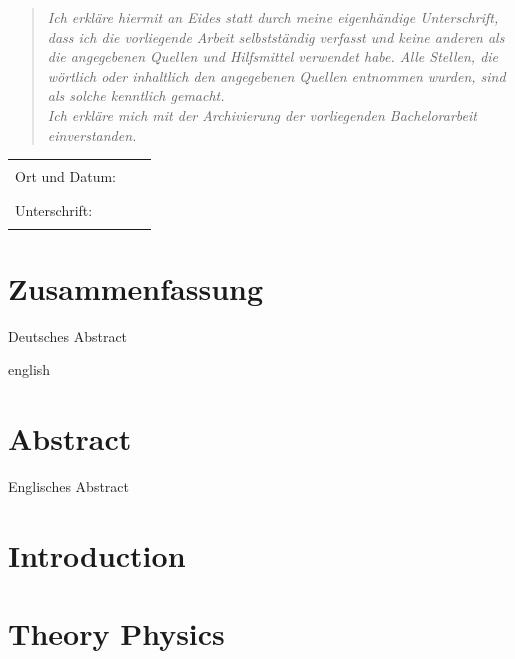 \documentclass[12pt,oneside,bibtotoc,liststotoc]{scrbook}
\begin{document}
\begin{quote}
\emph{Ich erkläre hiermit an Eides statt durch meine eigenhändige Unterschrift, dass ich die vorliegende Arbeit selbstständig verfasst und keine anderen als die angegebenen Quellen und Hilfsmittel verwendet habe. Alle Stellen, die wörtlich oder inhaltlich den angegebenen Quellen entnommen wurden, sind als solche kenntlich gemacht.
\\Ich erkläre mich mit der Archivierung der vorliegenden Bachelorarbeit einverstanden.
}
\end{quote}
\vspace{2.5cm}

\begin{flushleft}
\begin{tabular}{lll}
Ort und Datum: & & \rule{7cm}{0.4pt}\\[7ex]
Unterschrift: & & \rule{7cm}{0.4pt}
\end{tabular}
\end{flushleft}

\thispagestyle{empty}

\renewcommand{\baselinestretch}{1.00}\normalsize

\tableofcontents
\setcounter{page}{1}
\listoffigures
\renewcommand{\baselinestretch}{1.5}\normalsize

\newpage
\setcounter{page}{1}

\chapter*{Zusammenfassung}
Deutsches Abstract

\begin{otherlanguage*}{english}
\chapter*{Abstract}
Englisches Abstract
\end{otherlanguage*}





\chapter{Introduction}

\chapter{Theory Physics}
\end{document}

